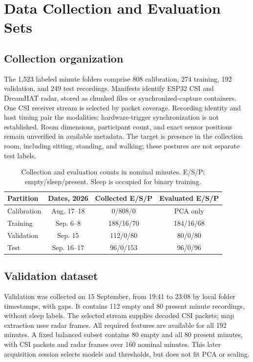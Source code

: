 \documentclass[conference,10pt,letterpaper]{IEEEtran}
\begin{document}
\section{Data Collection and Evaluation Sets}\label{sec:data}
\subsection{Collection organization}
The 1,523 labeled minute folders comprise 808 calibration, 274 training, 192 validation, and 249 test recordings. Manifests identify ESP32 CSI and DreamHAT radar, stored as chunked files or synchronized-capture containers. One CSI receiver stream is selected by packet coverage. Recording identity and host timing pair the modalities; hardware-trigger synchronization is not established. Room dimensions, participant count, and exact sensor positions remain unverified in available metadata. The target is presence in the collection room, including sitting, standing, and walking; these postures are not separate test labels.

\begin{table}[t]
\centering\caption{Collection and evaluation counts in nominal minutes. E/S/P: empty/sleep/present. Sleep is occupied for binary training.}
\label{tab:data}\footnotesize
\begin{tabular}{lccc}\toprule
Partition & Dates, 2026 & Collected E/S/P & Evaluated E/S/P\\\midrule
Calibration & Aug. 17--18 & 0/808/0 & PCA only\\
Training & Sep. 6--8 & 188/16/70 & 184/16/68\\
Validation & Sep. 15 & 112/0/80 & 80/0/80\\
Test & Sep. 16--17 & 96/0/153 & 96/0/96\\\bottomrule
\end{tabular}
\end{table}

\subsection{Validation dataset}
Validation was collected on 15 September, from 19:41 to 23:08 by local folder timestamps, with gaps. It contains 112 empty and 80 present minute recordings, without sleep labels. The selected stream supplies \ValPackets{} decoded CSI packets; map extraction uses \ValFrames{} radar frames. All required features are available for all 192 minutes. A fixed balanced subset contains 80 empty and all 80 present minutes, with \ValSelectedPackets{} CSI packets and \ValSelectedFrames{} radar frames over 160 nominal minutes. This later acquisition session selects models and thresholds, but does not fit PCA or scaling.
\end{document}
